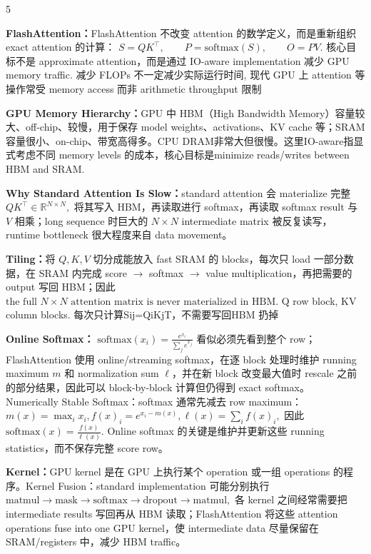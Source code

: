 \documentclass[a4paper, landscape]{article}
\begin{document}
\begin{multicols}{5}
\par \textbf{FlashAttention：}FlashAttention 不改变 attention 的数学定义，而是重新组织 exact attention 的计算：
\(
S=QK^\top,\qquad
P=\mathrm{softmax}(S),\qquad
O=PV.
\)
核心目标不是 approximate attention，而是通过 IO-aware implementation 减少 GPU memory traffic. 减少 FLOPs 不一定减少实际运行时间, 现代 GPU 上 attention 等操作常受 memory access 而非 arithmetic throughput 限制

\par \textbf{GPU Memory Hierarchy：}GPU 中 HBM（High Bandwidth Memory）容量较大、off-chip、较慢，用于保存 model weights、activations、KV cache 等；SRAM 容量很小、on-chip、带宽高得多。CPU DRAM非常大但很慢。这里IO-aware指显式考虑不同 memory levels 的成本，核心目标是minimize reads/writes between HBM and SRAM.

\par \textbf{Why Standard Attention Is Slow：}standard attention 会 materialize 完整
\(
QK^\top\in\mathbb{R}^{N\times N},
\)
将其写入 HBM，再读取进行 softmax，再读取 softmax result 与 \(V\) 相乘；long sequence 时巨大的 \(N\times N\) intermediate matrix 被反复读写，runtime bottleneck 很大程度来自 data movement。

\par \textbf{Tiling：}将 \(Q,K,V\) 切分成能放入 fast SRAM 的 blocks，每次只 load 一部分数据，在 SRAM 内完成 score \(\rightarrow\) softmax \(\rightarrow\) value multiplication，再把需要的 output 写回 HBM；因此
\(\text{the full }N\times N\text{ attention matrix is never materialized in HBM}.
\) Q row block, KV column blocks. 每次只计算Sij=QiKjT，不需要写回HBM 扔掉

\par \textbf{Online Softmax：}
\(
\mathrm{softmax}(x_i)=\frac{e^{x_i}}{\sum_j e^{x_j}}
\)
看似必须先看到整个 row；FlashAttention 使用 online/streaming softmax，在逐 block 处理时维护 running maximum \(m\) 和 normalization sum \(\ell\)，并在新 block 改变最大值时 rescale 之前的部分结果，因此可以 block-by-block 计算但仍得到 exact softmax。
Numerically Stable Softmax：softmax 通常先减去 row maximum：
\(
m(x)=\max_i x_i,
f(x)_i=e^{x_i-m(x)},
\ell(x)=\sum_i f(x)_i,
\)
因此
\(
\mathrm{softmax}(x)=\frac{f(x)}{\ell(x)}.
\)
Online softmax 的关键是维护并更新这些 running statistics，而不保存完整 score row。

\par \textbf{Kernel：}GPU kernel 是在 GPU 上执行某个 operation 或一组 operations 的程序。Kernel Fusion：standard implementation 可能分别执行
\(
\text{matmul}\rightarrow\text{mask}\rightarrow\text{softmax}\rightarrow\text{dropout}\rightarrow\text{matmul},
\)
各 kernel 之间经常需要把 intermediate results 写回再从 HBM 读取；FlashAttention 将这些 attention operations fuse into one GPU kernel，使 intermediate data 尽量保留在 SRAM/registers 中，减少 HBM traffic。


\end{multicols}
\end{document}

